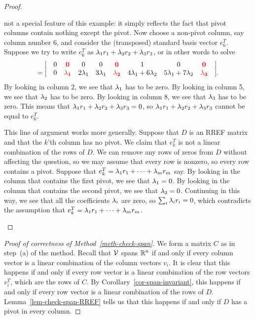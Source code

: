 \documentclass[reqno]{amsart}
\theoremstyle{definition}
\begin{document}
\begin{proof}
\begin{itemize}
   not a special feature of this example: it simply reflects the fact
   that pivot columns contain nothing except the pivot.  Now choose a
   non-pivot column, say column number $6$, and consider the
   (transposed) standard
   basis vector $e_6^T$.  Suppose we try to write $e_6^T$ as
   $\lambda_1r_1+\lambda_2r_2+\lambda_3r_3$, or in other words to solve
   \[ \begin{array}{rccccccccl}
        [ & 0 & {\color{red}\mathbf{0}} & 0 & 0 &
          {\color{red}\mathbf{0}} & 1 & 0 & {\color{red}\mathbf{0}} & ] \\
       =[ & 0 & {\color{red}\mathbf{\lambda_1}} & 2\lambda_1 & 3\lambda_1 &
           {\color{red}\mathbf{\lambda_2}} & 4\lambda_1+6\lambda_2 &
            5\lambda_1+7\lambda_2 & {\color{red}\mathbf{\lambda_3}} &].
      \end{array}
   \]
   By looking in column 2, we see that
   $\lambda_1$ has to be zero.  By looking in column 5, we see that
   $\lambda_2$ has to be zero.  By looking in column 8, we see that
   $\lambda_3$ has to be zero.  This means that
   $\lambda_1r_1+\lambda_2r_2+\lambda_3r_3=0$, so $\lambda_1r_1+\lambda_2r_2+\lambda_3r_3$
   cannot be equal to $e_6^T$.

   This line of argument works more generally.  Suppose that $D$ is an
   RREF matrix and that the $k$'th column has no pivot.  We claim that
   $e_k^T$ is not a linear combination of the rows of $D$.  We can remove
   any rows of zeros from $D$ without affecting the question, so we
   may assume that every row is nonzero, so every row contains a
   pivot.  Suppose that $e_k^T=\lambda_1r_1+\dotsb+\lambda_mr_m$ say.  By
   looking in the column that contains the first pivot, we see that
   $\lambda_1=0$.  By looking in the column that contains the second
   pivot, we see that $\lambda_2=0$.  Continuing in this way, we see that
   all the coefficients $\lambda_i$ are zero, so $\sum_i\lambda_ir_i=0$, which
   contradicts the assumption that $e_k^T=\lambda_1r_1+\dotsb+\lambda_mr_m$.
   \qedhere
 \end{itemize}
\end{proof}

\begin{proof}[Proof of correctness of Method~\ref{meth-check-span}]
 We form a matrix $C$ as in step~(a) of the method.  Recall that $\mathcal{V}$
 spans ${\mathbb{R}}^n$ if and only if every column vector is a linear
 combination of the column vectors $v_i$.  It is clear that this
 happens if and only if every row vector is a linear combination of
 the row vectors $v_i^T$, which are the rows of $C$.  By
 Corollary~\ref{cor-span-invariant}, this happens if and only if every
 row vector is a linear combination of the rows of $D$.
 Lemma~\ref{lem-check-span-RREF} tells us that this happens if and
 only if $D$ has a pivot in every column.
\end{proof}
\end{document}
